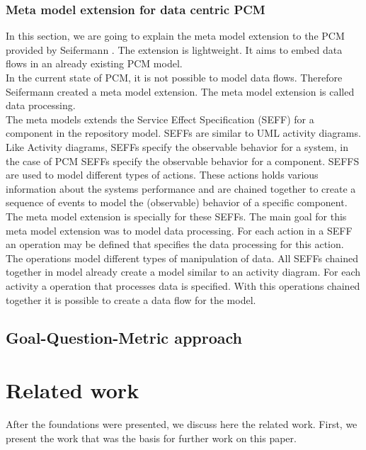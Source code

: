 \subsection{Meta model extension for data centric PCM}
\label{MMext}
In this section, we are going to explain the meta model extension to the PCM provided by Seifermann \cite{MMextension}. The extension is lightweight. It aims to embed data flows in an already existing PCM model.\\ 
In the current state of PCM, it is not possible to model data flows. Therefore Seifermann created a meta model extension. The meta model extension is called data processing. \\
The meta models extends the Service Effect Specification (SEFF) for a component in the repository model. SEFFs are similar to UML activity diagrams. Like Activity diagrams, SEFFs specify the observable behavior for a system, in the case of PCM SEFFs specify the observable behavior for a component. SEFFS are used to model different types of actions. These actions holds various information about the systems performance and are chained together to create a sequence of events to model the (observable) behavior of a specific component.\\ The meta model extension is specially for these SEFFs. The main goal for this meta model extension was to model data processing.  For each action in a SEFF an operation may be defined that specifies the data processing for this action. The operations model different types of manipulation of data. All SEFFs chained together in model already create a model similar to an activity diagram. For each activity a operation that processes data is specified. With this operations chained together it is possible to create a data flow for the model. 
\section{Goal-Question-Metric approach}
\label{GQM_Expl}

\chapter{Related work}
After the foundations were presented, we discuss here the related work.  First, we present the work that was the basis for further work on this paper.

